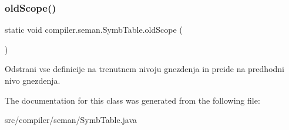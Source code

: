 \subsubsection{\texorpdfstring{old\+Scope()}{oldScope()}}
{\footnotesize\ttfamily static void compiler.\+seman.\+Symb\+Table.\+old\+Scope (\begin{DoxyParamCaption}{ }\end{DoxyParamCaption})\hspace{0.3cm}{\ttfamily [static]}}

Odstrani vse definicije na trenutnem nivoju gnezdenja in preide na predhodni nivo gnezdenja. 

The documentation for this class was generated from the following file\+:\begin{DoxyCompactItemize}
\item 
src/compiler/seman/Symb\+Table.\+java\end{DoxyCompactItemize}
